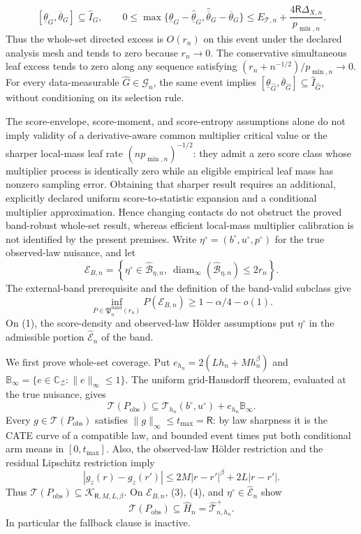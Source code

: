 \[
[\underline\theta_G,\overline\theta_G]\subseteq\widehat I_G,
\qquad
0\leq
\max\{\underline\theta_G-\widehat{\underline\theta}_G,
\widehat{\overline\theta}_G-\overline\theta_G\}
\leq E_{\mathcal T,n}+\frac{4\mathsf R\Delta_{X,n}}{p_{\min,n}}.
\]
Thus the whole-set directed excess is \(O(r_n)\) on this event under the declared analysis mesh and tends to zero because \(r_n\to0\).  The conservative simultaneous leaf excess tends to zero along any sequence satisfying \((r_n+n^{-1/2})/p_{\min,n}\to0\).  For every data-measurable \(\widehat G\in\mathcal G_n\), the same event implies \([\underline\theta_{\widehat G},\overline\theta_{\widehat G}]\subseteq\widehat I_{\widehat G}\), without conditioning on its selection rule.

The score-envelope, score-moment, and score-entropy assumptions alone do not imply validity of a derivative-aware common multiplier critical value or the sharper local-mass leaf rate \((np_{\min,n})^{-1/2}\): they admit a zero score class whose multiplier process is identically zero while an eligible empirical leaf mass has nonzero sampling error.  Obtaining that sharper result requires an additional, explicitly declared uniform score-to-statistic expansion and a conditional multiplier approximation.  Hence changing contacts do not obstruct the proved band-robust whole-set result, whereas efficient local-mass multiplier calibration is not identified by the present premises.
Write \(\eta^\circ=(b^\circ,u^\circ,p^\circ)\) for the true observed-law nuisance, and let
\[
\mathcal E_{B,n}=
\left\{\eta^\circ\in\widehat{\mathcal B}_{\eta,n},\
\operatorname{diam}_\infty(\widehat{\mathcal B}_{\eta,n})\leq2r_n\right\}.
\tag{1}
\]
The external-band prerequisite and the definition of the band-valid subclass give
\[
\inf_{P\in\mathfrak P_n^{\mathrm{band}}(r_n)}P(\mathcal E_{B,n})
\geq1-\alpha/4-o(1).
\tag{2}
\]
On (1), the score-density and observed-law H\"older assumptions put \(\eta^\circ\) in the admissible portion \(\widehat{\mathcal E}_n\) of the band.

We first prove whole-set coverage.  Put \(e_{h_n}=2(Lh_n+Mh_n^\beta)\) and \(\mathbb B_\infty=\{e\in\mathbb C_{\mathcal Z}:\|e\|_\infty\leq1\}\).  The uniform grid-Hausdorff theorem, evaluated at the true nuisance, gives
\[
\mathcal T(P_{\mathrm{obs}})
\subseteq\mathcal T_{h_n}(b^\circ,u^\circ)+e_{h_n}\mathbb B_\infty.
\tag{3}
\]
Every \(g\in\mathcal T(P_{\mathrm{obs}})\) satisfies \(\|g\|_\infty\leq t_{\max}=\mathsf R\): by law sharpness it is the CATE curve of a compatible law, and bounded event times put both conditional arm means in \([0,t_{\max}]\).  Also, the observed-law H\"older restriction and the residual Lipschitz restriction imply
\[
|g_z(r)-g_z(r')|
\leq2M|r-r'|^\beta+2L|r-r'|.
\tag{4}
\]
Thus \(\mathcal T(P_{\mathrm{obs}})\subseteq\mathcal K_{\mathsf R,M,L,\beta}\).  On \(\mathcal E_{B,n}\), (3), (4), and \(\eta^\circ\in\widehat{\mathcal E}_n\) show
\[
\mathcal T(P_{\mathrm{obs}})\subseteq\widehat H_n
=\widehat{\mathcal T}_{n,h_n}^{+}.
\tag{5}
\]
In particular the fallback clause is inactive.

